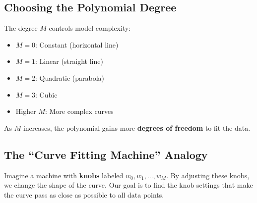 \subsection{Choosing the Polynomial Degree}

The degree $M$ controls model complexity:
\begin{itemize}
    \item $M = 0$: Constant (horizontal line)
    \item $M = 1$: Linear (straight line)
    \item $M = 2$: Quadratic (parabola)
    \item $M = 3$: Cubic
    \item Higher $M$: More complex curves
\end{itemize}

As $M$ increases, the polynomial gains more \textbf{degrees of freedom} to fit the data.

\subsection{The ``Curve Fitting Machine'' Analogy}

Imagine a machine with \textbf{knobs} labeled $w_0, w_1, \ldots, w_M$. By adjusting these knobs, we change the shape of the curve. Our goal is to find the knob settings that make the curve pass as close as possible to all data points.

\begin{center}
\end{center}


